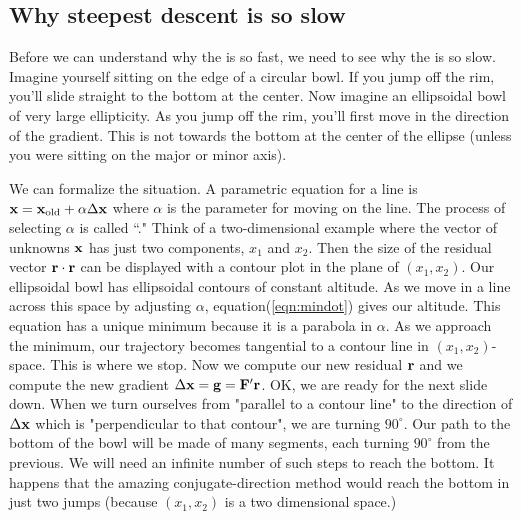 \subsection{Why steepest descent is so slow}
Before we can understand why the  is so fast,
we need to see why the
is so slow.
Imagine yourself sitting on the edge of a circular bowl.
If you jump off the rim, you'll slide straight to the bottom
at the center.
Now imagine an ellipsoidal bowl of very large ellipticity.
As you jump off the rim, you'll first move in the
direction of the gradient.
This is not towards the bottom at the center of the ellipse
(unless you were sitting on the major or minor axis).
\par
We can formalize the situation.
A parametric equation for a line is
$\bold x=\bold x_{\rm old} +\alpha \Delta \bold x$
where $\alpha$ is the parameter for moving on the line.
The process of selecting $\alpha$ is called ``."
Think of a two-dimensional example
where the vector of unknowns $\bold x$
has just two components, $x_1$ and $x_2$.
Then the size of the residual vector $\bold r \cdot \bold r$ can be
displayed with a contour plot in the plane of $(x_1,x_2)$.
Our ellipsoidal bowl has ellipsoidal contours of constant altitude.
As we move in a line across this space by adjusting $\alpha$,
equation(\ref{eqn:mindot})
gives our altitude.
This equation has a unique minimum because it is a parabola in $\alpha$.
As we approach the minimum,
our trajectory becomes tangential to a contour line in  $(x_1,x_2)$-space.
This is where we stop.
Now we compute our new residual $\bold r$
and we compute the new gradient
$\Delta \bold x = \bold g = \bold F' \bold r$.
OK, we are ready for the next slide down.
When we turn ourselves from "parallel to a contour line"
to the direction of $\Delta \bold x$ which is "perpendicular to that contour",
we are turning $90^\circ$.
Our path to the bottom of the bowl will be made of many segments,
each turning $90^\circ$ from the previous.
We will need an infinite number of such steps to reach the bottom.
It happens that the amazing conjugate-direction method
would reach the bottom in just two jumps
(because $(x_1,x_2)$ is a two dimensional space.)


